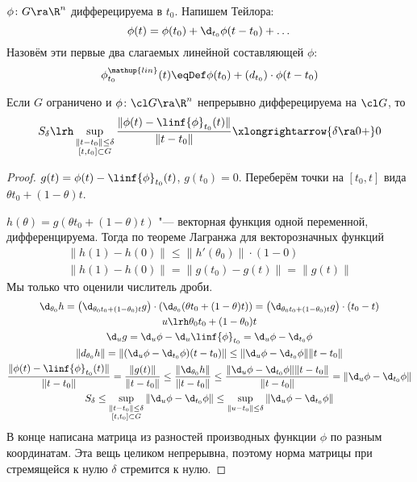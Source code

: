 \begin{Def}
	$\phi\colon G \ra \R^n$ дифферецируема в $t_0$.
	Напишем Тейлора:
	\[
		\phi(t) = \phi(t_0) + \d_{t_0} \phi(t - t_0) + \dots
	\]
	Назовём эти первые два слагаемых линейной составляющей $\phi$:
	\[
		\phi^{\mathup{lin}}_{t_0} (t) \eqDef \phi(t_0) + \left( d_{t_0} \right) \cdot \phi(t - t_0)
	\]
\end{Def}

\begin{lemma}
	Если $G$ ограничено и $\phi\colon \cl G \ra \R^n$ непрерывно дифферецируема на $\cl G$, то
	\[
		S_\delta \lrh \sup_{\substack{\|t-t_0\| \le \delta \\ [t, t_0] \subset G}} \frac{\|\phi(t) - \linf{\phi}_{t_0} (t)\|}{\|t-t_0\|} \xlongrightarrow{\delta \ra 0+} 0
	\]
\end{lemma}
\begin{proof}
	$g(t) = \phi(t) - \linf{\phi}_{t_0} (t)$, $g(t_0) = 0$.
	Переберём точки на $[t_0, t]$ вида $\theta t_0 + (1-\theta) t$.

	$h(\theta) = g(\theta t_0 + (1-\theta) t)$ "--- векторная функция одной переменной, дифференцируема.
	Тогда по теореме Лагранжа для векторозначных функций
	\begin{gather*}
		\|h(1) - h(0)\| \le \|h'(\theta_0)\| \cdot (1-0) \\
		\|h(1) - h(0)\| = \|g(t_0) - g(t)\| = \|g(t)\|
	\end{gather*}
	Мы только что оценили числитель дроби.
	\begin{gather*}
		\d_{\theta_0}h = \left(\d_{\theta_0 t_0 + (1-\theta_0) t} g\right) \cdot \left(\d_{\theta_0} (\theta t_0 + (1-\theta) t)\right)
			= \left(\d_{\theta_0 t_0 + (1-\theta_0) t} g\right) \cdot (t_0 - t) \\
		u \lrh \theta_0 t_0 + (1-\theta_0) t \\
		\d_u g = \d_u \phi - \d_u \linf{\phi}_{t_0} = \d_u \phi - \d_{t_0} \phi \\
		\|d_{\theta_0} h\| = \|(\d_u \phi - \d_{t_0} \phi)(t-t_0)\| \le \|\d_u \phi - \d_{t_0} \phi\| \|t-t_0\| \\
		\frac{\|\phi(t) - \linf{\phi}_{t_0} (t)\|}{\|t-t_0\|} = \frac{\|g(t)\|}{\|t-t_0\|} \le \frac{\|\d_{\theta_0} h\|}{\|t-t_0\|}
			\le \frac{\|\d_u \phi - \d_{t_0} \phi\| \|t-t_0\|}{\|t-t_0\|} = \|\d_u \phi - \d_{t_0} \phi\| \\
		S_\delta \le \sup_{\substack{\|t-t_0\| \le \delta \\ [t, t_0] \subset G}} \|\d_u \phi - \d_{t_0} \phi\|
			\le \sup_{\|u-t_0\|\le \delta} \|\d_u \phi - \d_{t_0} \phi\|
	\end{gather*}
	В конце написана матрица из разностей производных функции $\phi$ по разным координатам.
	Эта вещь целиком непрерывна, поэтому норма матрицы при стремящейся к нулю $\delta$ стремится к нулю.
\end{proof}

